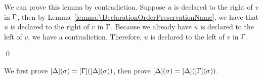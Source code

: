We can prove this lemma by contradiction. Suppose $u$ is declared to the right
of $v$ in $\Gamma$, then by Lemma~\ref{lemma:\DeclarationOrderPreservationName},
we have that $u$ is declared to the right of $v$ in $\Gamma$. Because we already
have $u$ is declared to the left of $v$, we have a contradiction. Therefore, $u$
is declared to the left of $v$ in $\Gamma$.

\qed

\begin{lemma}[\SubstitutionExtensionInvarianceName]
  \label{lemma:\SubstitutionExtensionInvarianceName}
  \SubstitutionExtensionInvarianceBody
\end{lemma}
\proof

We first prove $[\Delta](\sigma) = [\Gamma]([\Delta](\sigma))$,
then prove $[\Delta](\sigma) = [\Delta]([\Gamma](\sigma))$.

